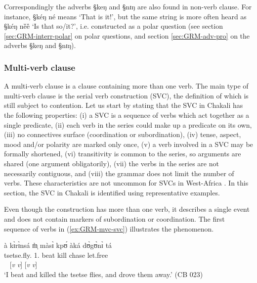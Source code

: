 Correspondingly the adverbs {\S keŋ} and {\S  nɪŋ} are also found in non-verb
clause. For instance, {\S kéŋ né} means `That is it!', but the same string is
more often heard as {\S kéŋ nȅȅ} `Is that so/it?',  i.e.
constructed  as a polar question (see section \ref{sec:GRM-interr-polar} on 
polar questions, and section \ref{sec:GRM-adv-pro}  on  the adverbs {\S keŋ} and
{\S  nɪŋ}).




\subsubsection{Multi-verb clause}
\label{sec:GRM-multi-verb-clause}



A multi-verb clause is a clause containing more than one verb. The main type of
multi-verb clause is the serial verb construction (SVC), the definition of which
is still subject to contention. Let us start by stating that the SVC in Chakali
has the following properties: (i) a SVC is a sequence of verbs which act
together as a single predicate, (ii) each verb in the series could make up a
predicate on its own, (iii)  no connectives  surface (coordination or
subordination), (iv)  tense, aspect, mood and/or polarity are marked only once,
(v)  a verb involved in a SVC may be formally shortened,  (vi)  transitivity is
common to the series, so arguments are shared (one argument obligatorily), (vii)
the verbs in the series are not necessarily contiguous, and  (viii) the grammar
does not limit the number of verbs. These characteristics are not uncommon for 
SVCs in West-Africa \citep{Amek05a}. In this section, the SVC in Chakali is
identified using representative examples. 


Even though the construction has more than one
verb, it describes a single event and does not contain  markers of
subordination or coordination. The first sequence of verbs in
(\ref{ex:GRM-mvc-svc}) illustrates the phenomenon.



\begin{exe}
\ex\label{ex:GRM-mvc-svc}
\glll à   	kɪ̀rɪ̀nsá    	m̩̀    	màsɪ̀ 	kpʊ́  	àká  	dʊ̀gʊ̀nɪ̀ tá\\
{\art}	tsetse.fly.{\pl} 	{1.\sg}     	beat 	kill 	{\conn} 
chase  	     let.free\\
 {} {} {}  {} [{\it v} {\it v}]  {} [{\it v} {\it v}]\\
\glt `I beat and killed the tsetse flies, and drove them away.' (CB 023)
\end{exe}

